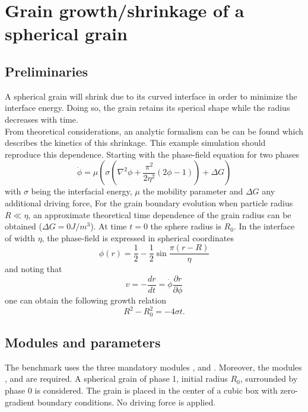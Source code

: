 \section{Grain growth/shrinkage of a spherical grain}
\label{sec:example_graingrowth}
\subsection{Preliminaries}
\label{sec:example_graingrowth_prelim}
A spherical grain will shrink due to its curved interface in order to minimize the interface energy. Doing so, the grain retains its sperical shape 
while the radius decreases with time.\\

From theoretical considerations, an analytic formalism can be can be found which describes the kinetics of this shrinkage. This example simulation should reproduce this dependence.
Starting with the phase-field equation for two phases
\begin{equation}
\dot\phi = \mu \left(\sigma \left(\nabla^2\phi+ \frac{\pi^2}{2\eta^2}(2\phi-1)\right) + \Delta G\right)
\label{eq:graingrowth_singlegrainpde}
\end{equation}
with $\sigma$ being the interfacial energy, $\mu$ the mobility parameter and $\Delta G$ any additional driving force, 
For the grain boundary evolution when particle radius $R \ll \eta$, an approximate 
theoretical time dependence of the grain radius can be obtained ($\Delta G = \si{0}{J/m^3}$). At time $t=0$ the sphere radius is $R_0$. In the interface of width $\eta$, the phase-field is expressed in spherical coordinates
\begin{equation}
    \phi(r)= \frac{1}{2} - \frac{1}{2}\sin\frac{\pi(r-R)}{\eta}
\end{equation}
and noting that 
\begin{equation}
    v=-\frac{dr}{dt}=\dot\phi\frac{\partial r}{\partial \phi}
\end{equation}
one can obtain the following growth relation
\begin{equation}
    R^2-R_0^2=-4\sigma t.
\end{equation}

\subsection{Modules and parameters}
\label{sec:example_graingrowth_setup}
The benchmark uses the three mandatory modules ,  and . Moreover, the modules ,  and  are required. A spherical grain of phase 1, initial radius $R_0$, surrounded by phase 0 is considered. The grain is
placed in the center of a cubic box with zero-gradient boundary conditions. No
driving force is applied.\\

